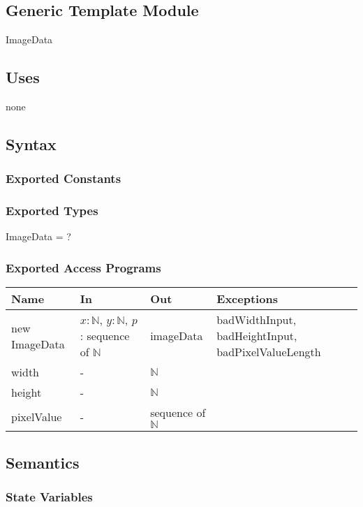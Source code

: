 \documentclass[12pt, titlepage]{article}
\begin{document}
\subsection{Generic Template Module}

ImageData

\subsection{Uses}

none

\subsection{Syntax}

\subsubsection{Exported Constants}

\subsubsection{Exported Types}

ImageData = ?

\subsubsection{Exported Access Programs}

\begin{center}
\begin{tabular}{p{3cm} p{4cm} p{3cm} p{5cm}}
\hline
\textbf{Name} & \textbf{In} & \textbf{Out} & \textbf{Exceptions} \\
\hline
new ImageData & $x: \mathbb{N}$, $y: \mathbb{N}$, $p$: sequence of $\mathbb{N}$
&
imageData & badWidthInput, badHeightInput, badPixelValueLength\\
width & - & $\mathbb{N}$\\
height & - & $\mathbb{N}$ & \\
pixelValue & - & sequence of $\mathbb{N}$\\
\hline
\end{tabular}
\end{center}

\subsection{Semantics}

\subsubsection{State Variables}
\end{document}
